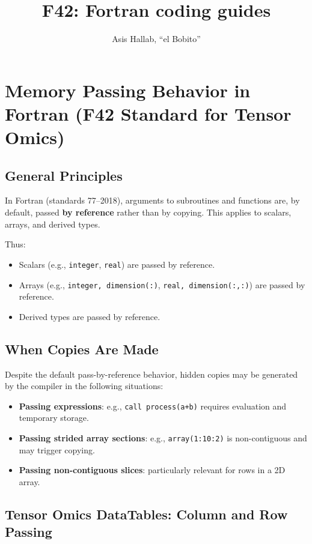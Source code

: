 \documentclass{article}
\title{F42: Fortran coding guides}
\author{Asis Hallab, ``el Bobito''}
\begin{document}
\maketitle

\section{Memory Passing Behavior in Fortran (F42 Standard for Tensor Omics)}

\subsection{General Principles}

In Fortran (standards 77--2018), arguments to subroutines and functions are, by default, passed \textbf{by reference} rather than by copying.  
This applies to scalars, arrays, and derived types.

Thus:

\begin{itemize}
    \item Scalars (e.g., \texttt{integer}, \texttt{real}) are passed by reference.
    \item Arrays (e.g., \texttt{integer, dimension(:)}, \texttt{real, dimension(:,:)}) are passed by reference.
    \item Derived types are passed by reference.
\end{itemize}

\subsection{When Copies Are Made}

Despite the default pass-by-reference behavior, hidden copies may be generated by the compiler in the following situations:

\begin{itemize}
    \item \textbf{Passing expressions}: e.g., \texttt{call process(a+b)} requires evaluation and temporary storage.
    \item \textbf{Passing strided array sections}: e.g., \texttt{array(1:10:2)} is non-contiguous and may trigger copying.
    \item \textbf{Passing non-contiguous slices}: particularly relevant for rows in a 2D array.
\end{itemize}

\subsection{Tensor Omics DataTables: Column and Row Passing}
\end{document}
